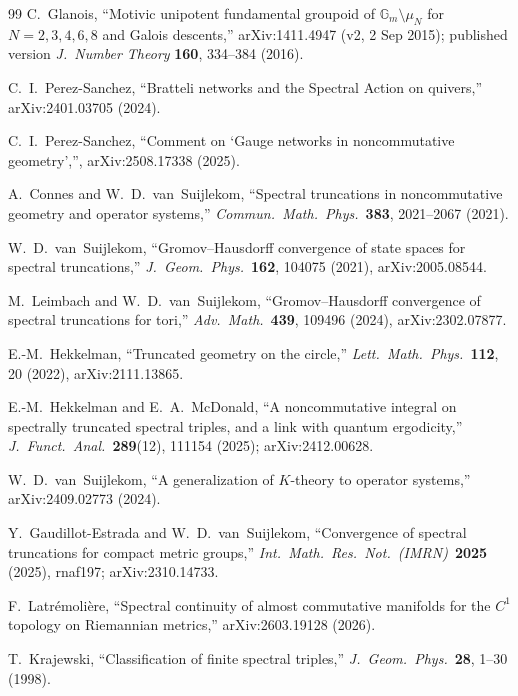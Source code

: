 \documentclass[11pt]{article}
\begin{document}
\begin{thebibliography}{99}
C.~Glanois,
``Motivic unipotent fundamental groupoid of
$\mathbb{G}_m \setminus \mu_N$ for $N = 2, 3, 4, 6, 8$ and
Galois descents,''
arXiv:1411.4947 (v2, 2 Sep 2015);
published version \textit{J.~Number Theory} \textbf{160},
334--384 (2016).

C.~I.~Perez-Sanchez,
``Bratteli networks and the Spectral Action on quivers,''
arXiv:2401.03705 (2024).

C.~I.~Perez-Sanchez,
``Comment on `Gauge networks in noncommutative geometry','',
arXiv:2508.17338 (2025).

A.~Connes and W.~D.~van~Suijlekom,
``Spectral truncations in noncommutative geometry and operator
systems,''
\textit{Commun.~Math.~Phys.}\ \textbf{383}, 2021--2067 (2021).

W.~D.~van~Suijlekom,
``Gromov--Hausdorff convergence of state spaces for spectral
truncations,''
\textit{J.~Geom.~Phys.}\ \textbf{162}, 104075 (2021), arXiv:2005.08544.

M.~Leimbach and W.~D.~van~Suijlekom,
``Gromov--Hausdorff convergence of spectral truncations for tori,''
\textit{Adv.~Math.}\ \textbf{439}, 109496 (2024), arXiv:2302.07877.

E.-M.~Hekkelman,
``Truncated geometry on the circle,''
\textit{Lett.~Math.~Phys.}\ \textbf{112}, 20 (2022),
arXiv:2111.13865.

E.-M.~Hekkelman and E.~A.~McDonald,
``A noncommutative integral on spectrally truncated spectral triples,
and a link with quantum ergodicity,''
\textit{J.~Funct.~Anal.}\ \textbf{289}(12), 111154 (2025);
arXiv:2412.00628.

W.~D.~van~Suijlekom,
``A generalization of $K$-theory to operator systems,''
arXiv:2409.02773 (2024).

Y.~Gaudillot-Estrada and W.~D.~van~Suijlekom,
``Convergence of spectral truncations for compact metric groups,''
\textit{Int.~Math.~Res.~Not.\ (IMRN)}\ \textbf{2025} (2025), rnaf197;
arXiv:2310.14733.

F.~Latr\'emoli\`ere,
``Spectral continuity of almost commutative manifolds for the
$C^1$ topology on Riemannian metrics,''
arXiv:2603.19128 (2026).

T.~Krajewski,
``Classification of finite spectral triples,''
\textit{J.~Geom.~Phys.}\ \textbf{28}, 1--30 (1998).


\end{thebibliography}
\end{document}
